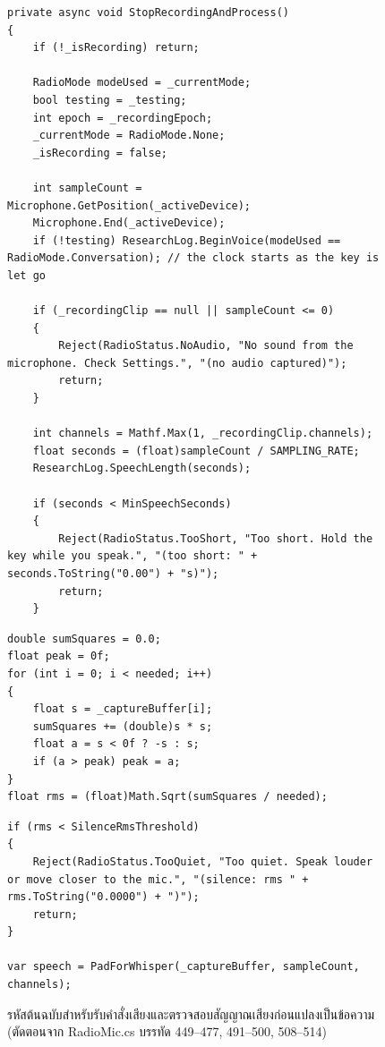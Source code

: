 \begin{figure}[H]
\centering
\begin{lstlisting}[language={[Sharp]C},basicstyle=\ttfamily\scriptsize,firstnumber=449]
private async void StopRecordingAndProcess()
{
    if (!_isRecording) return;

    RadioMode modeUsed = _currentMode;
    bool testing = _testing;
    int epoch = _recordingEpoch;
    _currentMode = RadioMode.None;
    _isRecording = false;

    int sampleCount = Microphone.GetPosition(_activeDevice);
    Microphone.End(_activeDevice);
    if (!testing) ResearchLog.BeginVoice(modeUsed == RadioMode.Conversation); // the clock starts as the key is let go

    if (_recordingClip == null || sampleCount <= 0)
    {
        Reject(RadioStatus.NoAudio, "No sound from the microphone. Check Settings.", "(no audio captured)");
        return;
    }

    int channels = Mathf.Max(1, _recordingClip.channels);
    float seconds = (float)sampleCount / SAMPLING_RATE;
    ResearchLog.SpeechLength(seconds);

    if (seconds < MinSpeechSeconds)
    {
        Reject(RadioStatus.TooShort, "Too short. Hold the key while you speak.", "(too short: " + seconds.ToString("0.00") + "s)");
        return;
    }
\end{lstlisting}
\vspace{0.3em}
\begin{lstlisting}[language={[Sharp]C},basicstyle=\ttfamily\scriptsize,firstnumber=491]
double sumSquares = 0.0;
float peak = 0f;
for (int i = 0; i < needed; i++)
{
    float s = _captureBuffer[i];
    sumSquares += (double)s * s;
    float a = s < 0f ? -s : s;
    if (a > peak) peak = a;
}
float rms = (float)Math.Sqrt(sumSquares / needed);
\end{lstlisting}
\vspace{0.3em}
\begin{lstlisting}[language={[Sharp]C},basicstyle=\ttfamily\scriptsize,firstnumber=508]
if (rms < SilenceRmsThreshold)
{
    Reject(RadioStatus.TooQuiet, "Too quiet. Speak louder or move closer to the mic.", "(silence: rms " + rms.ToString("0.0000") + ")");
    return;
}

var speech = PadForWhisper(_captureBuffer, sampleCount, channels);
\end{lstlisting}
\caption{รหัสต้นฉบับสำหรับรับคำสั่งเสียงและตรวจสอบสัญญาณเสียงก่อนแปลงเป็นข้อความ (ตัดตอนจาก RadioMic.cs บรรทัด 449--477, 491--500, 508--514)}
\label{fig:code_stt}
\end{figure}
